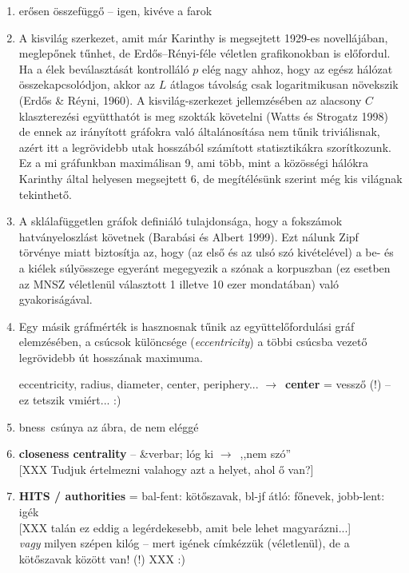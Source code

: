 \documentclass{llncs}
\newcommand{\nyil}{$\rightarrow$\ }
\newcommand{\embf}[1]{\textbf{#1}}
\newcommand{\liex}[1]{\emph{#1}}
\newcommand{\XXX}[1]{{\small \color{megjcolor} [XXX #1]}}
\newcommand{\bness}{bness}   %
\begin{document}
\begin{enumerate}

\item 
erősen összefüggő -- igen, kivéve a farok

\item A kisvilág szerkezet, amit már  Karinthy is megsejtett 1929-es
  novellájában, meglepőnek tűnhet, de Erdős--Rényi-féle véletlen grafikonokban
    is előfordul. Ha a élek beválasztását kontrolláló $p$ elég nagy ahhoz, hogy
    az egész hálózat összekapcsolódjon, akkor az $L$ átlagos távolság csak
    logaritmikusan növekszik (Erdős \& Réyni, 1960). A kisvilág-szerkezet
    jellemzésében az alacsony $C$ klaszterezési együtthatót is meg szokták
    követelni (Watts és Strogatz 1998) de ennek az irányított gráfokra való
    általánosítása nem tűnik triviálisnak, azért itt a legrövidebb utak
    hosszából számított statisztikákra szorítkozunk. Ez a mi gráfunkban
    maximálisan 9, ami több, mint a közösségi hálókra Karinthy által helyesen
    megsejtett 6, de megítélésünk szerint még kis világnak tekinthető.
    
\item 
  A sklálafüggetlen gráfok definiáló tulajdonsága, hogy a fokszámok
    hatványeloszlást követnek (Barabási és Albert 1999). Ezt nálunk Zipf
    törvénye miatt 
    biztosítja az, hogy (az első és az ulsó szó kivételével) a be- és a kiélek
    súlyösszege egyeránt megegyezik a szónak a korpuszban (ez esetben az MNSZ
    véletlenül választott 1 illetve 10 ezer mondatában) való gyakoriságával.

\item
  Egy másik gráfmérték is hasznosnak tűnik az együttelőfordulási gráf 
    elemzésében, a csúcsok különcsége (\emph{eccentricity}) a többi csúcsba
    vezető legrövidebb út hosszának maximuma. 
    
    eccentricity, radius, diameter, center, periphery...
\nyil \embf{center} = vessző (!) -- ez tetszik vmiért... :)

\item 
\bness\ csúnya az ábra, de nem eléggé

\item 
\embf{closeness centrality} -- \&verbar; lóg ki \nyil ,,nem szó''\\
\XXX{Tudjuk értelmezni valahogy azt a helyet, ahol ő van?}

\item 
\embf{HITS / authorities} =
bal-fent: kötőszavak, bl-jf átló: főnevek, jobb-lent: igék\\
\XXX{talán ez eddig a legérdekesebb, amit bele lehet magyarázni...}\\
\liex{vagy} milyen szépen kilóg -- mert igének címkézzük (véletlenül),
de a kötőszavak között van! (!) XXX :)

\end{enumerate}
\end{document}
